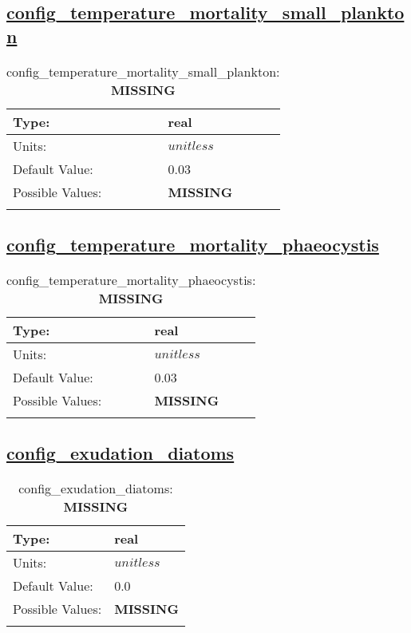 \subsection[config\_temperature\_mortality\_small\_plankton]{\hyperref[sec:nm_tab_biogeochemistry]{config\_temperature\_mortality\_small\_plankton}}
\label{subsec:nm_sec_config_temperature_mortality_small_plankton}
\begin{center}
\begin{longtable}{| p{2.0in} || p{4.0in} |}
    \hline
    Type: & real \\
    \hline
    Units: & $unitless$ \\
    \hline
    Default Value: & 0.03 \\
    \hline
    Possible Values: & {\bf \color{red} MISSING} \\
    \hline
    \caption{config\_temperature\_mortality\_small\_plankton: {\bf \color{red} MISSING}}
\end{longtable}
\end{center}
\subsection[config\_temperature\_mortality\_phaeocystis]{\hyperref[sec:nm_tab_biogeochemistry]{config\_temperature\_mortality\_phaeocystis}}
\label{subsec:nm_sec_config_temperature_mortality_phaeocystis}
\begin{center}
\begin{longtable}{| p{2.0in} || p{4.0in} |}
    \hline
    Type: & real \\
    \hline
    Units: & $unitless$ \\
    \hline
    Default Value: & 0.03 \\
    \hline
    Possible Values: & {\bf \color{red} MISSING} \\
    \hline
    \caption{config\_temperature\_mortality\_phaeocystis: {\bf \color{red} MISSING}}
\end{longtable}
\end{center}
\subsection[config\_exudation\_diatoms]{\hyperref[sec:nm_tab_biogeochemistry]{config\_exudation\_diatoms}}
\label{subsec:nm_sec_config_exudation_diatoms}
\begin{center}
\begin{longtable}{| p{2.0in} || p{4.0in} |}
    \hline
    Type: & real \\
    \hline
    Units: & $unitless$ \\
    \hline
    Default Value: & 0.0 \\
    \hline
    Possible Values: & {\bf \color{red} MISSING} \\
    \hline
    \caption{config\_exudation\_diatoms: {\bf \color{red} MISSING}}
\end{longtable}
\end{center}
